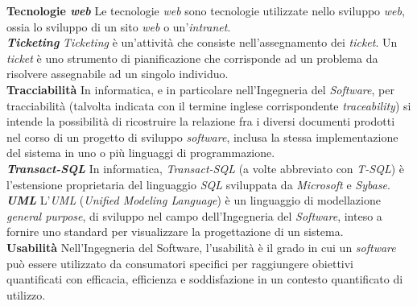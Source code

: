 \textbf{Tecnologie \textit{web}} Le tecnologie \textit{web} sono tecnologie utilizzate nello sviluppo \textit{web}, ossia lo sviluppo di un sito \textit{web} o un'\textit{intranet}. \\

\textbf{\textit{Ticketing}} \textit{Ticketing} è un'attività che consiste nell'assegnamento dei \textit{ticket}. Un \textit{ticket} è uno strumento di pianificazione che corrisponde ad un problema da risolvere assegnabile ad un singolo individuo.\\

\textbf{Tracciabilità} In informatica, e in particolare nell'Ingegneria del \textit{Software}, per tracciabilità (talvolta indicata con il termine inglese corrispondente \textit{traceability}) si intende la possibilità di ricostruire la relazione fra i diversi documenti prodotti nel corso di un progetto di sviluppo \textit{software}, inclusa la stessa implementazione del sistema in uno o più linguaggi di programmazione.\\

\textbf{\textit{Transact-SQL}} In informatica, \textit{Transact-SQL} (a volte abbreviato con \textit{T-SQL}) è l'estensione proprietaria del linguaggio \textit{SQL} sviluppata da \textit{Microsoft} e \textit{Sybase}.\\

\textbf{\textit{UML}} L'\textit{UML} (\textit{Unified Modeling Language}) è un linguaggio di modellazione \textit{general purpose}, di sviluppo nel campo dell'Ingegneria del \textit{Software}, inteso a fornire uno standard per visualizzare la progettazione di un sistema.\\

\textbf{Usabilità} Nell'Ingegneria del Software, l'usabilità è il grado in cui un \textit{software} può essere utilizzato da consumatori specifici per raggiungere obiettivi quantificati con efficacia, efficienza e soddisfazione in un contesto quantificato di utilizzo.
